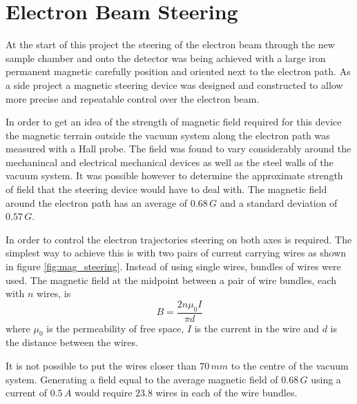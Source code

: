 \section{Electron Beam Steering}
At the start of this project the steering of the electron beam through the new sample chamber and onto the detector was being achieved with a large iron permanent magnetic carefully position and oriented next to the electron path. As a side project a magnetic steering device was designed and constructed to allow more precise and repeatable control over the electron beam.

In order to get an idea of the strength of magnetic field required for this device the magnetic terrain outside the vacuum system along the electron path was measured with a Hall probe. The field was found to vary considerably around the mechanincal and electrical mechanical devices as well as the steel walls of the vacuum system. It was possible however to determine the approximate strength of field that the steering device would have to deal with. The magnetic field around the electron path has an average of $0.68\,\unit{G}$ and a standard deviation of $0.57\,\unit{G}$.

In order to control the electron trajectories steering on both axes is required. The simplest way to achieve this is with two pairs of current carrying wires as shown in figure \ref{fig:mag_steering}. Instead of using single wires, bundles of wires were used. The magnetic field at the midpoint between a pair of wire bundles, each with $n$ wires, is
\begin{equation}
B=\frac{2n\mu_0I}{\pi d}
\end{equation}
where $\mu_0$ is the permeability of free space, $I$ is the current in the wire and $d$ is the distance between the wires.

It is not possible to put the wires closer than $70\,\unit{mm}$ to the centre of the vacuum system. Generating a field equal to the average magnetic field of $0.68\,\unit{G}$ using a current of $0.5\,\unit{A}$ would require $23.8$ wires in each of the wire bundles.

